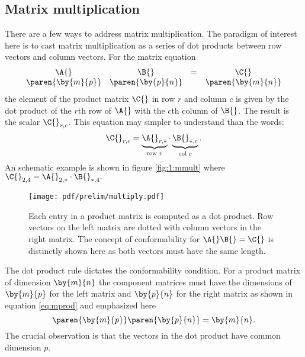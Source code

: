 \subsection{Matrix multiplication}
There are a few ways to address matrix multiplication. The paradigm of interest here is to cast matrix multiplication as a series of dot products between row vectors and column vectors. For the matrix equation
\begin{equation}
  \begin{array}{cccc}
  \A{}&\B{} &=& \C{}\\
  \paren{\by{m}{p}} & \paren{\by{p}{n}} && \paren{\by{m}{n}}
  \end{array}
  \label{eq:mprod}
\end{equation}
the element of the product matrix $\C{}$ in row $r$ and column $c$ is given by the dot product of the $r$th row of $\A{}$ with the $c$th column of $\B{}$. The result is the scalar $\C{}_{r,c}$. This equation may simpler to understand than the words:
\begin{equation}
  \C{}_{r,c} = \underbrace{\A{}_{r,*}}_{\text{row }r}\cdot\underbrace{\B{}_{*,c}}_{\text{col }c}.
  \label{eq:dot}
\end{equation}
An schematic example is shown in figure \eqref{fig:1:mmult} where $\C{}_{2,4} = \A{}_{2,*}\cdot\B{}_{*,4}.$
\begin{figure}[htbp] %
   \centering
   \texttt{[image: pdf/prelim/multiply.pdf]} 
   \caption[Each entry in a product matrix is computed as a dot product]{Each entry in a product matrix is computed as a dot product. Row vectors on the left matrix are dotted with column vectors in the right matrix. The concept of conformability for $\A{}\B{}=\C{}$ is distinctly shown here as both vectors must have the same length.}
   \label{fig:1:mmult}
\end{figure}
The dot product rule dictates the conformability condition. For a product matrix of dimension $\by{m}{n}$ the component matrices must have the dimensions
of $\by{m}{p}$ for the left matrix and $\by{p}{n}$ for the right matrix as shown in equation \eqref{eq:mprod} and emphasized here
\begin{equation}
\paren{\by{m}{p}}\paren{\by{p}{n}}=\by{m}{n}.
\end{equation}
The crucial observation is that the vectors in the dot product have common dimension $p$.

